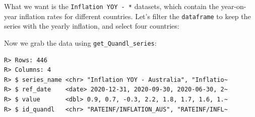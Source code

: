 \documentclass[
  12pt,
]{book}
\newenvironment{Shaded}{\begin{snugshade}}{\end{snugshade}}
\newcommand{\CommentTok}[1]{\textcolor[rgb]{0.37,0.37,0.37}{\textit{#1}}}
\newcommand{\DataTypeTok}[1]{\textcolor[rgb]{0.27,0.27,0.27}{#1}}
\newcommand{\KeywordTok}[1]{\textcolor[rgb]{0.27,0.27,0.27}{\textbf{#1}}}
\newcommand{\NormalTok}[1]{#1}
\newcommand{\OperatorTok}[1]{\textcolor[rgb]{0.43,0.43,0.43}{\textbf{#1}}}
\newcommand{\StringTok}[1]{\textcolor[rgb]{0.5,0.5,0.5}{#1}}
\begin{document}
What we want is the \texttt{\textquotesingle{}Inflation\ YOY\ -\ *\textquotesingle{}} datasets, which contain the year-on-year inflation rates for different countries. Let's filter the \texttt{dataframe} to keep the series with the yearly inflation, and select four countries:

\begin{Shaded}
\end{Shaded}

Now we grab the data using \texttt{get\_Quandl\_series}:

\begin{Shaded}
\end{Shaded}

\begin{verbatim}
R> Rows: 446
R> Columns: 4
R> $ series_name <chr> "Inflation YOY - Australia", "Inflatio~
R> $ ref_date    <date> 2020-12-31, 2020-09-30, 2020-06-30, 2~
R> $ value       <dbl> 0.9, 0.7, -0.3, 2.2, 1.8, 1.7, 1.6, 1.~
R> $ id_quandl   <chr> "RATEINF/INFLATION_AUS", "RATEINF/INFL~
\end{verbatim}
\end{document}
